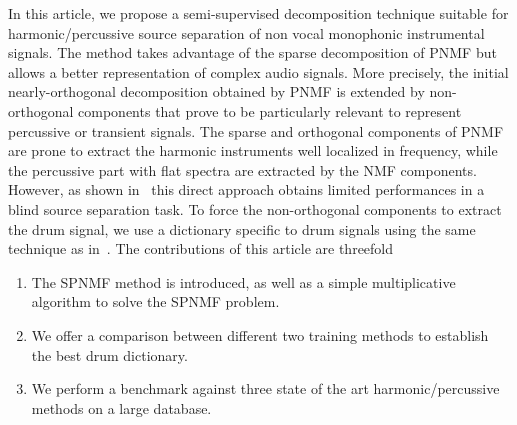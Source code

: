 In this article, we propose a semi-supervised decomposition technique suitable for harmonic/percussive source separation of non vocal monophonic instrumental signals. The method takes advantage of the sparse decomposition of PNMF but allows a better representation of complex audio signals. More precisely, the initial nearly-orthogonal decomposition obtained by PNMF is extended by non-orthogonal components that prove to be particularly relevant to represent percussive or transient signals. The sparse and orthogonal components of PNMF are prone to extract the harmonic instruments well localized in frequency, while the percussive part with flat spectra are extracted by the NMF components. However, as shown in~\cite{laroche2015structured} this direct approach obtains limited performances in a blind source separation task. To force the non-orthogonal components to extract the drum signal, we use a dictionary specific to drum signals using the same technique as in~\cite{wudrum}.
The contributions of this article are threefold
\begin{enumerate}
\item The SPNMF method is introduced, as well as a simple multiplicative algorithm to solve the SPNMF problem.
\item  We offer a comparison between different two training methods to establish the best drum dictionary.
\item We perform a benchmark against three state of the art harmonic/percussive methods on a large database.	
\end{enumerate}

